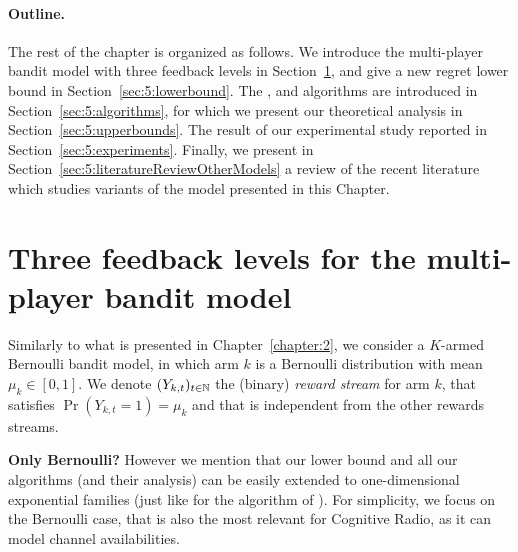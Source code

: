 


\paragraph{Outline.}
%
The rest of the chapter is organized as follows.
We introduce the multi-player bandit model with three feedback levels in Section~\ref{sec:5:model}, and give a new regret lower bound in Section~\ref{sec:5:lowerbound}.
The \RandTopM, \MCTopM{} and \Selfish{} algorithms are introduced in Section~\ref{sec:5:algorithms},
for which we present our theoretical analysis in Section~\ref{sec:5:upperbounds}.
The result of our experimental study reported in Section~\ref{sec:5:experiments}.
Finally, we present in Section~\ref{sec:5:literatureReviewOtherModels} a review of the recent literature which studies variants of the model presented in this Chapter.


\section{Three feedback levels for the multi-player bandit model}
\label{sec:5:model}

Similarly to what is presented in Chapter~\ref{chapter:2},
we consider a $K$-armed Bernoulli bandit model, %
in which arm $k$ is a Bernoulli distribution with mean $\mu_k\in[0,1]$.
We denote $(Y_{k,t})_{t\in\mathbb{N}}$ the \iid{} (binary) \emph{reward stream} for arm $k$, that satisfies $\Pr(Y_{k,t}=1) = \mu_k$ and that is independent from the other rewards streams.

\textbf{Only Bernoulli?}
However we mention that our lower bound and all our algorithms (and their analysis) can be easily extended to one-dimensional exponential families (just like for the \klUCB{} algorithm of \cite{KLUCBJournal}). For simplicity, we focus on the Bernoulli case, that is also the most relevant for Cognitive Radio, as it can model channel availabilities.


